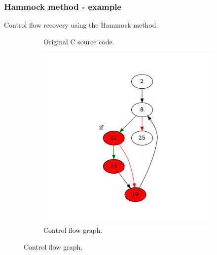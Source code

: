 \documentclass[aspectratio=1610]{beamer}
\begin{document}
\begin{frame}
	\frametitle{Hammock method - example}
	Control flow recovery using the Hammock method.
	\begin{figure}[htbp]
		\centering
		\begin{subfigure}[b]{0.30\textwidth}
			\centering
			
			\caption{Original C source code.}
		\end{subfigure}
		\begin{subfigure}[b]{0.50\textwidth}
			\centering
			\includegraphics[height=0.6\paperheight]{inc/methods/hammock/example/without-break/main_0002a.png}
			\caption{Control flow graph.}
		\end{subfigure}
	\end{figure}
\end{frame}
\end{document}
